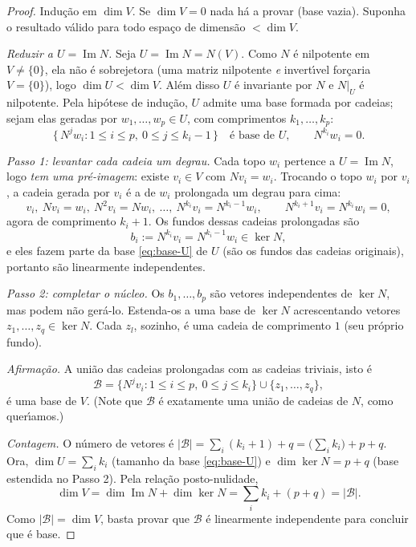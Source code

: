 \documentclass[11pt,a4paper]{amsart}
\newcommand{\img}{\operatorname{Im}}
\theoremstyle{plain}
\theoremstyle{definition}
\theoremstyle{remark}
\begin{document}
\begin{proof}
Indu\c{c}\~ao em $\dim V$. Se $\dim V=0$ nada h\'a a provar (base vazia).
Suponha o resultado v\'alido para todo espa\c{c}o de dimens\~ao $<\dim V$.

\emph{Reduzir a $U=\img N$.} Seja $U=\img N = N(V)$. Como $N$ \'e nilpotente em
$V\neq\{0\}$, ela n\~ao \'e sobrejetora (uma matriz nilpotente \emph{e}
invert\'\i vel for\c{c}aria $V=\{0\}$), logo $\dim U<\dim V$. Al\'em disso $U$
\'e invariante por $N$ e $N|_U$ \'e nilpotente. Pela hip\'otese de
indu\c{c}\~ao, $U$ admite uma base formada por cadeias; sejam elas geradas por
$w_1,\dots,w_p\in U$, com comprimentos $k_1,\dots,k_p$:
\begin{equation}\label{eq:base-U}
  \big\{\,N^{j}w_i : 1\le i\le p,\ 0\le j\le k_i-1\,\big\}
  \quad\text{\'e base de } U,
  \qquad N^{k_i}w_i=0.
\end{equation}

\emph{Passo 1: levantar cada cadeia um degrau.} Cada topo $w_i$ pertence a
$U=\img N$, logo \emph{tem uma pr\'e-imagem}: existe $v_i\in V$ com $Nv_i=w_i$.
Trocando o topo $w_i$ por $v_i$, a cadeia gerada por $v_i$ \'e a de $w_i$
prolongada um degrau para cima:
\[
  v_i,\ Nv_i=w_i,\ N^2 v_i = N w_i,\ \dots,\ N^{k_i}v_i = N^{k_i-1}w_i,
  \qquad N^{k_i+1}v_i = N^{k_i}w_i = 0,
\]
agora de comprimento $k_i+1$. Os fundos dessas cadeias prolongadas s\~ao
\[
  b_i := N^{k_i}v_i = N^{k_i-1}w_i \in \ker N ,
\]
e eles fazem parte da base \eqref{eq:base-U} de $U$ (s\~ao os fundos das
cadeias originais), portanto s\~ao linearmente independentes.

\emph{Passo 2: completar o n\'ucleo.} Os $b_1,\dots,b_p$ s\~ao vetores
independentes de $\ker N$, mas podem n\~ao ger\'a-lo. Estenda-os a uma base
de $\ker N$ acrescentando vetores $z_1,\dots,z_q\in\ker N$. Cada $z_l$, sozinho,
\'e uma cadeia de comprimento $1$ (seu pr\'oprio fundo).

\emph{Afirma\c{c}\~ao.} A uni\~ao das cadeias prolongadas com as cadeias
triviais, isto \'e
\[
  \mathcal{B} = \big\{N^{j}v_i : 1\le i\le p,\ 0\le j\le k_i\big\}
                \cup \{z_1,\dots,z_q\},
\]
\'e uma base de $V$. (Note que $\mathcal{B}$ \'e exatamente uma uni\~ao de
cadeias de $N$, como quer\'\i amos.)

\emph{Contagem.} O n\'umero de vetores \'e
$|\mathcal{B}| = \sum_i(k_i+1)+q = \big(\sum_i k_i\big)+p+q$. Ora,
$\dim U=\sum_i k_i$ (tamanho da base \eqref{eq:base-U}) e $\dim\ker N=p+q$
(base estendida no Passo 2). Pela rela\c{c}\~ao posto-nulidade,
\[
  \dim V=\dim\img N+\dim\ker N = \textstyle\sum_i k_i + (p+q) = |\mathcal{B}|.
\]
Como $|\mathcal{B}|=\dim V$, basta provar que $\mathcal{B}$ \'e linearmente
independente para concluir que \'e base.


\end{proof}
\end{document}
